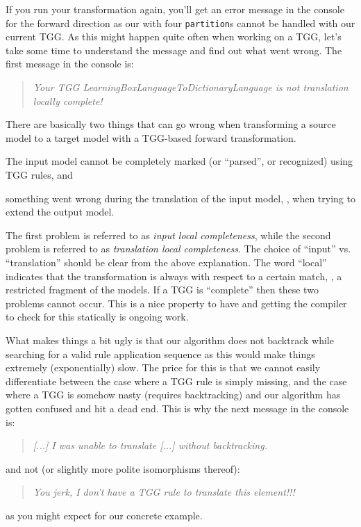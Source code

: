 If you run your transformation again, you'll get an error message in the console for the forward direction as our  with four \texttt{partition}s cannot be handled with our current TGG.
As this might happen quite often when working on a TGG, let's take some time to understand the message and find out what went wrong.
The first message in the console is:
\begin{quote}
  \emph{Your TGG LearningBoxLanguageToDictionaryLanguage is not translation locally complete!}
\end{quote}

There are basically two things that can go wrong when transforming a source model to a target model with a TGG-based forward transformation.%
\begin{inparaenum}[(1)]
\item The input model cannot be completely marked (or \enquote{parsed}, or recognized) using TGG rules, and 
\item something went wrong during the translation of the input model, \idest, when trying to extend the output model.
\end{inparaenum}
The first problem is referred to as \emph{input local completeness}, while the second problem is referred to as \emph{translation local completeness}.
The choice of \enquote{input} vs. \enquote{translation} should be clear from the above explanation.
The word \enquote{local} indicates that the transformation is always with respect to a certain match, \idest, a restricted fragment of the models.
If a TGG is \enquote{complete} then these two problems cannot occur.
This is a nice property to have and getting the compiler to check for this statically is ongoing work. 

What makes things a bit ugly is that our algorithm does not backtrack while searching for a valid rule application sequence as this would make things extremely (exponentially) slow.
The price for this is that we cannot easily differentiate between the case where a TGG rule is simply missing, and the case where a TGG is somehow nasty (requires backtracking) and our algorithm has gotten confused and hit a dead end.
This is why the next message in the console is:
\begin{quote}
\emph{[...] I was unable to translate [...] without backtracking.}
\end{quote}
and not (or slightly more polite isomorphisms thereof):
\begin{quote}
  \emph{You jerk, I don't have a TGG rule to translate this element!!!}
\end{quote}
as you might expect for our concrete example.

